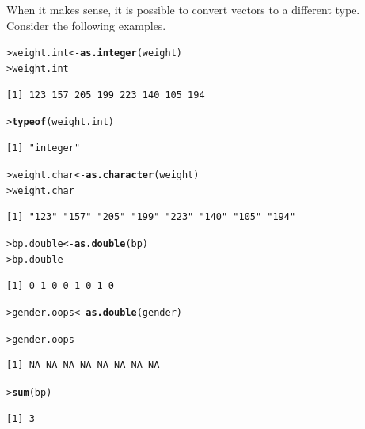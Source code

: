 \documentclass[12pt,oneside]{book}\usepackage[]{graphicx}\usepackage[]{color}
\makeatletter
\newcommand{\hlstd}[1]{\textcolor[rgb]{0.345,0.345,0.345}{#1}}%
\newcommand{\hlkwb}[1]{\textcolor[rgb]{0.69,0.353,0.396}{#1}}%
\newcommand{\hlkwd}[1]{\textcolor[rgb]{0.737,0.353,0.396}{\textbf{#1}}}%
\newenvironment{kframe}{%
 \def\at@end@of@kframe{}%
 \ifinner\ifhmode%
  \def\at@end@of@kframe{\end{minipage}}%
  \begin{minipage}{\columnwidth}%
 \fi\fi%
 \def\FrameCommand##1{\hskip\@totalleftmargin \hskip-\fboxsep
 \colorbox{shadecolor}{##1}\hskip-\fboxsep
     \hskip-\linewidth \hskip-\@totalleftmargin \hskip\columnwidth}%
 \MakeFramed {\advance\hsize-\width
   \@totalleftmargin\z@ \linewidth\hsize
   \@setminipage}}%
 {\par\unskip\endMakeFramed%
 \at@end@of@kframe}
\newenvironment{knitrout}{}{} %
\makeatother
\begin{document}
When it makes sense, it is possible to convert vectors to a different type. Consider the following examples.
\begin{knitrout}
\color{fgcolor}\begin{kframe}
\begin{alltt}
\hlstd{> }\hlstd{weight.int} \hlkwb{<-} \hlkwd{as.integer}\hlstd{(weight)}
\hlstd{> }\hlstd{weight.int}
\end{alltt}
\begin{verbatim}
[1] 123 157 205 199 223 140 105 194
\end{verbatim}
\begin{alltt}
\hlstd{> }\hlkwd{typeof}\hlstd{(weight.int)}
\end{alltt}
\begin{verbatim}
[1] "integer"
\end{verbatim}
\begin{alltt}
\hlstd{> }\hlstd{weight.char} \hlkwb{<-} \hlkwd{as.character}\hlstd{(weight)}
\hlstd{> }\hlstd{weight.char}
\end{alltt}
\begin{verbatim}
[1] "123" "157" "205" "199" "223" "140" "105" "194"
\end{verbatim}
\begin{alltt}
\hlstd{> }\hlstd{bp.double} \hlkwb{<-} \hlkwd{as.double}\hlstd{(bp)}
\hlstd{> }\hlstd{bp.double}
\end{alltt}
\begin{verbatim}
[1] 0 1 0 0 1 0 1 0
\end{verbatim}
\begin{alltt}
\hlstd{> }\hlstd{gender.oops} \hlkwb{<-} \hlkwd{as.double}\hlstd{(gender)}
\end{alltt}


{\ttfamily\noindent\color{warningcolor}{Warning: NAs introduced by coercion}}\begin{alltt}
\hlstd{> }\hlstd{gender.oops}
\end{alltt}
\begin{verbatim}
[1] NA NA NA NA NA NA NA NA
\end{verbatim}
\begin{alltt}
\hlstd{> }\hlkwd{sum}\hlstd{(bp)}
\end{alltt}
\begin{verbatim}
[1] 3
\end{verbatim}
\end{kframe}
\end{knitrout}
\end{document}

